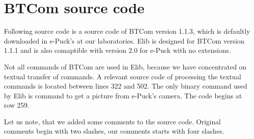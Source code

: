 \chapter{BTCom source code}\label{app:btcomsource}
	Following source code is a source code of BTCom version 1.1.3, which is defaultly downloaded in e-Puck's
	at our laboratories. Elib is designed for BTCom version 1.1.1 and is also comaptible with version 2.0
	for e-Puck with no extensions.

	Not all commands of BTCom are used in Elib, because we have concentrated on textual transfer of commands.
	A relevant source code of processing the textual commands is located between  lines 322 and  502.
	The only binary command used by Elib is command to get a picture from e-Puck's camera.
	The code begins at row 259.

	Let us note, that we added some comments to the source code. Original comments begin with two slashes,
	our comments starts with four slashes.

